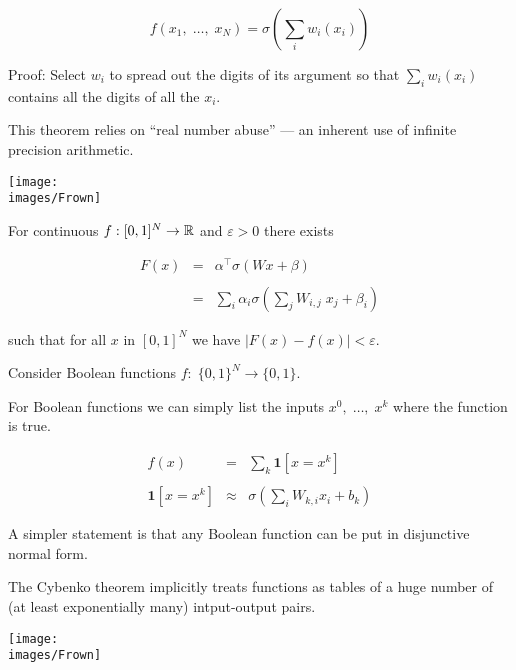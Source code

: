 {\vfill
$$f(x_1,\;\ldots,\;x_N) = \sigma\left(\sum_i w_i(x_i)\right)$$

\vfill
Proof: Select $w_i$ to spread out the digits of its argument so that $\sum_i w_i(x_i)$ contains all the digits of all the $x_i$.


This theorem relies on ``real number abuse'' --- an inherent use of infinite precision arithmetic.

\vfill
\centerline{\texttt{[image: \\images/Frown]}}


For continuous $f: [0,1]^N \rightarrow \mathbb{R}$ and $\varepsilon >0$ there exists

\vfill
\begin{eqnarray*}
  F(x) &= & \alpha^\top \sigma(Wx + \beta) \\
  \\
  & = & \sum_i \alpha_i \sigma\left(\sum_j W_{i,j} \;x_j + \beta_i\right)
\end{eqnarray*}


\vfill
such that for all $x$ in $[0,1]^N$ we have $| F( x ) - f ( x ) | < \varepsilon$.


Consider Boolean functions $f:\;\{0,1\}^N \rightarrow \{0,1\}$.

\vfill
For Boolean functions we can simply list the inputs $x^0,\;\ldots,\;x^k$ where the function is true.

\begin{eqnarray*}
  f(x) & = & \sum_k \mathbf{1}[x=x^k] \\
  \\
  \mathbf{1}[x = x^k] & \approx & \sigma\left(\sum_i W_{k,i} x_i + b_k\right)
\end{eqnarray*}

\vfill
A simpler statement is that any Boolean function can be put in disjunctive normal form.


The Cybenko theorem implicitly treats functions as tables of a huge number of (at least exponentially many) intput-output pairs.

\vfill
\centerline{\texttt{[image: \\images/Frown]}}


}

